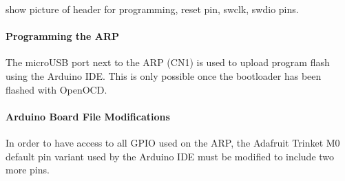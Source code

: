 \documentclass{article}
\begin{document}
show picture of header for programming, reset pin, swclk, swdio pins. 
\paragraph{Programming the ARP}
The microUSB port next to the ARP (CN1) is used to upload program flash using the Arduino IDE. This is only possible once the bootloader has been flashed with OpenOCD.

\paragraph{Arduino Board File Modifications}
In order to have access to all GPIO used on the ARP, the Adafruit Trinket M0 default pin variant used by the Arduino IDE must be modified to include two more pins.
\end{document}
